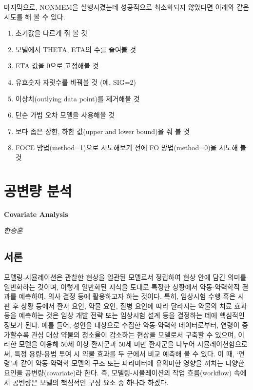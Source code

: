 \documentclass[
  10pt,
  krantz2,
  a4paper]{krantz}
\providecommand{\tightlist}{%
  \setlength{\itemsep}{0pt}\setlength{\parskip}{0pt}}
\theoremstyle{definition}
\theoremstyle{definition}
\theoremstyle{definition}
\theoremstyle{remark}
\begin{document}
마지막으로, NONMEM을 실행시켰는데 성공적으로 최소화되지 않았다면 아래와 같은 시도를 해 볼 수 있다.

\begin{enumerate}
\def\labelenumi{\arabic{enumi}.}
\tightlist
\item
  초기값을 다르게 줘 볼 것
\item
  모델에서 THETA, ETA의 수를 줄여볼 것
\item
  ETA 값을 0으로 고정해볼 것
\item
  유효숫자 자릿수를 바꿔볼 것 (예, SIG=2)
\item
  이상치(outlying data point)를 제거해볼 것
\item
  단순 가법 오차 모델을 사용해볼 것
\item
  보다 좁은 상한, 하한 값(upper and lower bound)을 줘 볼 것
\item
  FOCE 방법(method=1)으로 시도해보기 전에 FO 방법(method=0)을 시도해 볼 것
\end{enumerate}

\hypertarget{covariate-analysis}{%
\chapter{공변량 분석}\label{covariate-analysis}}

\textbf{Covariate Analysis}

\emph{한승훈}

\hypertarget{uxc11cuxb860-1}{%
\section{서론}\label{uxc11cuxb860-1}}

모델링-시뮬레이션은 관찰한 현상을 일관된 모델로서 정립하여 현상 안에 담긴 의미를 일반화하는 것이며, 이렇게 일반화된 지식을 토대로 특정한 상황에서 약동-약력학적 결과를 예측하여, 의사 결정 등에 활용하고자 하는 것이다. 특히, 임상시험 수행 혹은 시판 후 상황 등에서 환자 요인, 약물 요인, 질병 요인에 따라 달라지는 약물의 치료 효과 등을 예측하는 것은 임상 개발 전략 또는 임상시험 설계 등을 결정하는 데에 핵심적인 정보가 된다. 예를 들어, 성인을 대상으로 수집한 약동-약력학 데이터로부터, 연령이 증가할수록 관심 대상 약물의 청소율이 감소하는 현상을 모델로서 구축할 수 있으며, 이러한 모델을 이용해 50세 이상 환자군과 50세 미만 환자군을 나누어 시뮬레이션함으로써, 특정 용량-용법 투여 시 약물 효과를 두 군에서 비교 예측해 볼 수 있다. 이 때, `연령'과 같이 약동-약력학 모델의 구조 또는 파라미터에 유의미한 영향을 끼치는 다양한 요인을 공변량(covariate)라 한다. 즉, 모델링-시뮬레이션의 작업 흐름(workflow) 속에서 공변량은 모델의 핵심적인 구성 요소 중 하나라 하겠다.
\end{document}
